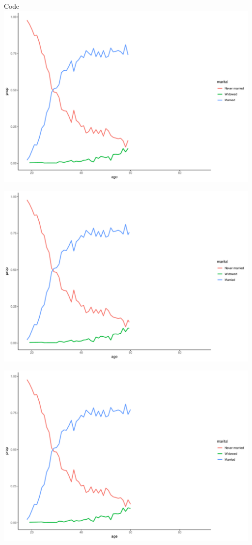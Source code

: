 \documentclass[
  ignorenonframetext,
]{beamer}
\begin{document}
\begin{frame}[fragile]{Code}
\includegraphics{gss_cat_files/figure-beamer/unnamed-chunk-1-62.pdf}

\includegraphics{gss_cat_files/figure-beamer/unnamed-chunk-1-63.pdf}

\includegraphics{gss_cat_files/figure-beamer/unnamed-chunk-1-64.pdf}


\end{frame}
\end{document}
